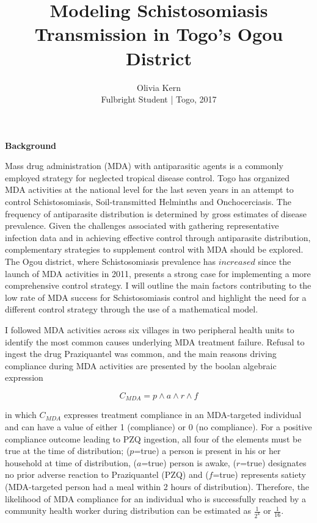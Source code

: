 \documentclass[12pt]{article}
\begin{document}
 

 
 
\title{Modeling Schistosomiasis Transmission in Togo's Ogou District}
\author{Olivia Kern\\
Fulbright Student | Togo, 2017} 
 
\maketitle \textbf{Background}
\linebreak

Mass drug administration (MDA) with antiparasitic agents is a commonly employed strategy for neglected tropical disease control. Togo has organized MDA activities at the national level for the last seven years in an attempt to control Schistosomiasis, Soil-transmitted Helminths and Onchocerciasis. The frequency of antiparasite distribution is determined by gross estimates of disease prevalence. Given the challenges associated with gathering representative infection data and in achieving effective control through antiparasite distribution, complementary strategies to supplement control with MDA should be explored. The Ogou district, where Schistosomiasis  prevalence has $increased$ since the launch of MDA activities in 2011, presents a strong case for implementing a more comprehensive control strategy. I will outline the main factors contributing to the low rate of MDA success for Schistosomiasis control and highlight the need for a different control strategy through the use of a mathematical model.
\bigskip

I followed MDA activities across six villages in two peripheral health units to identify the most common causes underlying MDA treatment failure. Refusal to ingest the drug Praziquantel was common, and the main reasons driving compliance during MDA activities are presented by the boolan algebraic expression

\begin{equation}\label{eq:probMDA}
 C_{MDA} = p \wedge a \wedge r \wedge f 
\end{equation}

in which $C_{MDA}$ expresses treatment compliance in an MDA-targeted individual and can have a value of either 1 (compliance) or 0 (no compliance). For a positive compliance outcome leading to PZQ ingestion, all four of the elements must be true at the time of distribution;  ($p$=true) a person is present in his or her household at time of distribution, ($a$=true) person is awake, ($r$=true) designates no prior adverse reaction to Praziquantel (PZQ) and ($f$=true) represents satiety (MDA-targeted person had a meal within 2 hours of distribution).  Therefore, the likelihood of MDA compliance for an individual who is successfully reached by a community health worker during distribution can be estimated as $\frac{1}{2^4}$ or $\frac{1}{16}$.
\bigskip
\end{document}
